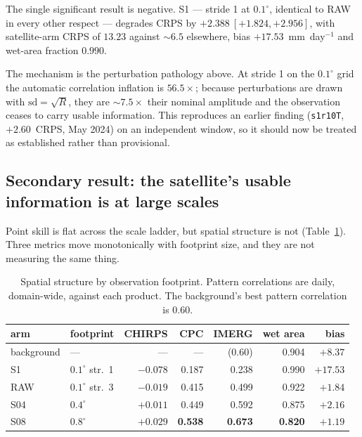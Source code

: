 The single significant result is negative. S1 --- stride 1 at $0.1^\circ$,
identical to RAW in every other respect --- degrades CRPS by
$+2.388~[+1.824, +2.956]$, with satellite-arm CRPS of $13.23$ against
${\sim}6.5$ elsewhere, bias $+17.53$~mm~day$^{-1}$ and wet-area fraction
$0.990$.

The mechanism is the perturbation pathology above. At stride 1 on the
$0.1^\circ$ grid the automatic correlation inflation is $56.5\times$; because
perturbations are drawn with $\mathrm{sd} = \sqrt{R}$, they are ${\sim}7.5\times$
their nominal amplitude and the observation ceases to carry usable information.
This reproduces an earlier finding (\texttt{s1r10T}, $+2.60$~CRPS, May 2024) on
an independent window, so it should now be treated as established rather than
provisional.

\subsection{Secondary result: the satellite's usable information is at large scales}

Point skill is flat across the scale ladder, but spatial structure is not
(Table~\ref{tab:ingestion-structure}). Three metrics move monotonically with
footprint size, and they are not measuring the same thing.

\begin{table}[t]
\centering
\caption{Spatial structure by observation footprint. Pattern correlations are
daily, domain-wide, against each product. The background's best pattern
correlation is $0.60$.}
\label{tab:ingestion-structure}
\small
\begin{tabular}{llrrrrr}
\hline
arm & footprint & CHIRPS & CPC & IMERG & wet area & bias \\
\hline
background & ---              & ---    & ---   & (0.60) & 0.904 & $+8.37$ \\
S1         & $0.1^\circ$ str.\ 1 & $-0.078$ & 0.187 & 0.238 & 0.990 & $+17.53$ \\
RAW        & $0.1^\circ$ str.\ 3 & $-0.019$ & 0.415 & 0.499 & 0.922 & $+1.84$ \\
S04        & $0.4^\circ$      & $+0.011$ & 0.449 & 0.592 & 0.875 & $+2.16$ \\
S08        & $0.8^\circ$      & $+0.029$ & \textbf{0.538} & \textbf{0.673} & \textbf{0.820} & \textbf{$+1.19$} \\
\hline
\end{tabular}
\end{table}

